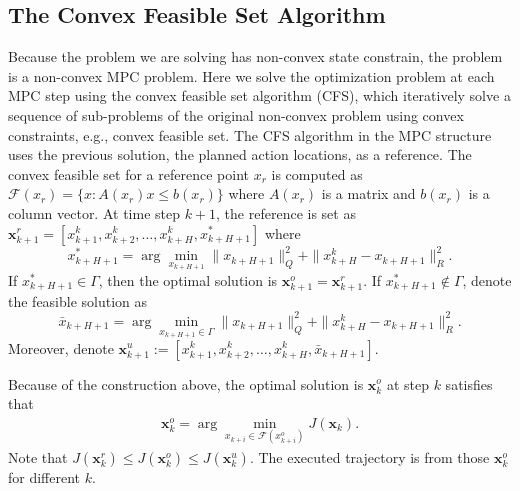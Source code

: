 \subsection{The Convex Feasible Set Algorithm}
Because the problem we are solving has non-convex state constrain, the problem is a non-convex MPC problem. Here we solve the optimization problem at each MPC step using the convex feasible set algorithm (CFS), which iteratively solve a sequence of sub-problems of the original non-convex problem using convex constraints, e.g., convex feasible set. The CFS algorithm in the MPC structure uses the previous solution, the planned action locations, as a reference. The convex feasible set for a reference point $x_r$ is computed as $\mathcal{F}(x_r) = \{x:A(x_r)x\leq b(x_r)\}$ where $A(x_r)$ is a matrix and $b(x_r)$ is a column vector. 
At time step $k+1$, the reference is set as $\mathbf{x}_{k+1}^{r}=[x_{k+1}^{k},x_{k+2}^{k},\ldots,x_{k+H}^k, x_{k+H+1}^*]$ where
\begin{equation}
x_{k+H+1}^* = \arg\min_{x_{k+H+1}} \|x_{k+H+1}\|_Q^2+\|x_{k+H}^k-x_{k+H+1}\|_R^2\text{.}
\end{equation}
If $x_{k+H+1}^*\in\Gamma$, then the optimal solution is $\mathbf{x}_{k+1}^o = \mathbf{x}_{k+1}^r$.  If $x_{k+H+1}^*\notin\Gamma$, denote the feasible solution as 
\begin{equation}
\bar{x}_{k+H+1} = \arg\min_{x_{k+H+1}\in\Gamma} \|x_{k+H+1}\|_Q^2
+\|x_{k+H}^k-x_{k+H+1}\|_R^2\text{.}
\end{equation}
Moreover, denote $\mathbf{x}_{k+1}^{u}:=[x_{k+1}^{k},x_{k+2}^{k},\ldots,x_{k+H}^k, \bar x_{k+H+1}]$. 

Because of the construction above, the optimal solution is $\mathbf{x}_k^{o}$ at step $k$ satisfies that
\begin{eqnarray}
\mathbf{x}_k^{o} = \arg\min_{x_{k+i}\in \mathcal{F}(x_{k+i}^o)}J(\mathbf{x}_k).
\end{eqnarray}
Note that $J(\mathbf{x}_k^{r})\leq J(\mathbf{x}_k^{o})\leq J(\mathbf{x}_k^{u})$. 
The executed trajectory is from those $\mathbf{x}_k^{o}$ for different $k$.


